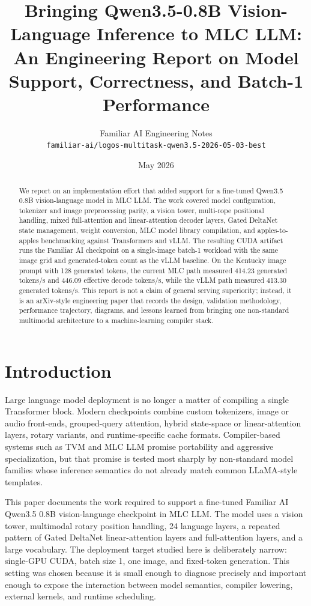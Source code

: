 \documentclass[10pt]{article}
\title{Bringing Qwen3.5-0.8B Vision-Language Inference to MLC LLM: \\
An Engineering Report on Model Support, Correctness, and Batch-1 Performance}
\author{
  Familiar AI Engineering Notes \\
  \texttt{familiar-ai/logos-multitask-qwen3.5-2026-05-03-best}
}
\date{May 2026}
\begin{document}
\maketitle

\begin{abstract}
We report on an implementation effort that added support for a fine-tuned
Qwen3.5 0.8B vision-language model in MLC LLM. The work covered model
configuration, tokenizer and image preprocessing parity, a vision tower,
multi-rope positional handling, mixed full-attention and linear-attention
decoder layers, Gated DeltaNet state management, weight conversion, MLC model
library compilation, and apples-to-apples benchmarking against Transformers and
vLLM. The resulting CUDA artifact runs the Familiar AI checkpoint on a
single-image batch-1 workload with the same image grid and generated-token
count as the vLLM baseline. On the Kentucky image prompt with 128 generated
tokens, the current MLC path measured 414.23 generated tokens/s and 446.09
effective decode tokens/s, while the vLLM path measured 413.30 generated
tokens/s. This report is not a claim of general serving superiority; instead,
it is an arXiv-style engineering paper that records the design, validation
methodology, performance trajectory, diagrams, and lessons learned from bringing
one non-standard multimodal architecture to a machine-learning compiler stack.
\end{abstract}

\section{Introduction}

Large language model deployment is no longer a matter of compiling a single
Transformer block. Modern checkpoints combine custom tokenizers, image or audio
front-ends, grouped-query attention, hybrid state-space or linear-attention
layers, rotary variants, and runtime-specific cache formats. Compiler-based
systems such as TVM and MLC LLM promise portability and aggressive
specialization, but that promise is tested most sharply by non-standard model
families whose inference semantics do not already match common LLaMA-style
templates.

This paper documents the work required to support a fine-tuned Familiar AI
Qwen3.5 0.8B vision-language checkpoint in MLC LLM. The model uses a vision
tower, multimodal rotary position handling, 24 language layers, a repeated
pattern of Gated DeltaNet linear-attention layers and full-attention layers, and
a large vocabulary. The deployment target studied here is deliberately narrow:
single-GPU CUDA, batch size 1, one image, and fixed-token generation. This
setting was chosen because it is small enough to diagnose precisely and
important enough to expose the interaction between model semantics, compiler
lowering, external kernels, and runtime scheduling.
\end{document}
